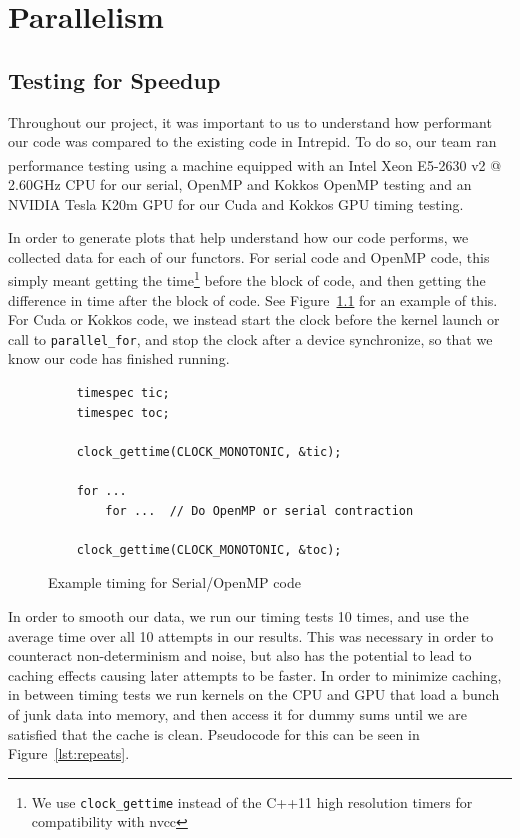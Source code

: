 \chapter{Parallelism}

\section{Testing for Speedup}

Throughout our project, it was important to us to understand how performant our
code was compared to the existing code in Intrepid.  To do so, our team ran
performance testing using a machine equipped with an Intel\textsuperscript{\textregistered} Xeon\textsuperscript{\textregistered} E5-2630 v2
@ 2.60GHz CPU for our serial, OpenMP and Kokkos OpenMP testing and an NVIDIA 
Tesla K20m GPU for our Cuda and Kokkos GPU timing
testing. 

In order to generate plots that help understand how our code performs, we
collected data for each of our functors.  For serial code
and OpenMP code, this simply meant getting the time\footnote{We use
\texttt{clock\_gettime} instead of the C++11 high resolution timers for compatibility with
nvcc} before the block of code, and then getting the difference in time after
the block of code. See Figure~\ref{lst:OMPTiming} for an example of this. For
Cuda or Kokkos code, we instead start the clock before the kernel launch or call
to \texttt{parallel\_for}, and stop the clock after a device synchronize, so
that we know our code has finished running.

\begin{figure}[ht]
    \begin{lstlisting}
    timespec tic;
    timespec toc;
    
    clock_gettime(CLOCK_MONOTONIC, &tic);
    
    for ...
    	for ...  // Do OpenMP or serial contraction
    
    clock_gettime(CLOCK_MONOTONIC, &toc);
 \end{lstlisting}
\caption{Example timing for Serial/OpenMP code}
\label{lst:OMPTiming}
\end{figure}

In order to smooth our data, we run our timing tests 10 times, and use the
average time over all 10 attempts in our results. This was necessary in order to
counteract non-determinism and noise, but also has the potential to lead to caching
effects causing later attempts to be faster. In order to minimize caching, in
between timing tests we run kernels on the CPU and GPU that load a bunch of
junk data into memory, and then access it for dummy sums until we are satisfied
that the cache is clean.  Pseudocode for this can be seen in
Figure~\ref{lst:repeats}.

